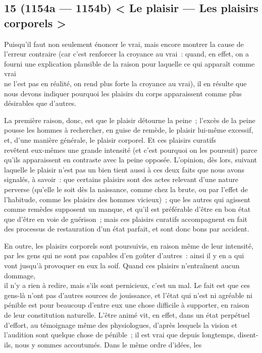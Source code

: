 \documentclass[french,twoside]{book} %
\begin{document}
\subsection[{15 (1154a — 1154b) < Le plaisir — Les plaisirs corporels >}]{15 (1154a — 1154b) < Le plaisir — Les plaisirs corporels >}
\noindent Puisqu’il faut non seulement énoncer le vrai, mais encore montrer la cause de l’erreur contraire (car c’est renforcer la croyance au vrai : quand, en effet, on a fourni une explication plausible de la raison pour laquelle ce qui apparaît comme vrai \\
ne l’est pas en réalité, on rend plus forte la croyance au vrai), il en résulte que nous devons indiquer pourquoi les plaisirs du corps apparaissent comme plus désirables que d’autres.\par
La première raison, donc, est que le plaisir détourne la peine ; l’excès de la peine pousse les hommes à rechercher, en guise de remède, le plaisir lui-même excessif, et, d’une manière générale, le plaisir corporel. Et ces plaisirs curatifs \\
revêtent eux-mêmes une grande intensité (et c’est pourquoi on les poursuit) parce qu’ils apparaissent en contraste avec la peine opposée. L’opinion, dès lors, suivant laquelle le plaisir n’est pas un bien tient aussi à ces deux faits que nous avons signalés, à savoir : que certains plaisirs sont des actes relevant d’une nature perverse (qu’elle le soit dès la naissance, comme chez la brute, ou par l’effet de l’habitude, comme les plaisirs des hommes vicieux) ; que les autres qui agissent comme remèdes supposent un manque, et qu’il est préférable d’être en  bon état que d’être en voie de guérison ; mais ces plaisirs curatifs accompagnent en fait des processus de restauration d’un état parfait, et sont donc bons par accident.\par
En outre, les plaisirs corporels sont poursuivis, en raison même de leur intensité, par les gens qui ne sont pas capables d’en goûter d’autres : ainsi il y en a qui vont jusqu’à provoquer en eux la soif. Quand ces plaisirs n’entraînent aucun dommage, \\
il n’y a rien à redire, mais s’ils sont pernicieux, c’est un mal. Le fait est que ces gens-là n’ont pas d’autres sources de jouissance, et l’état qui n’est ni agréable ni pénible est pour beaucoup d’entre eux une chose difficile à supporter, en raison de leur constitution naturelle. L’être animé vit, en effet, dans un état perpétuel d’effort, au témoignage même des physiologues, d’après lesquels la vision et l’audition sont quelque chose de pénible ; il est vrai que depuis longtemps, disent-ils, nous y sommes accoutumés. Dans le même ordre d’idées, les \\
\end{document}
